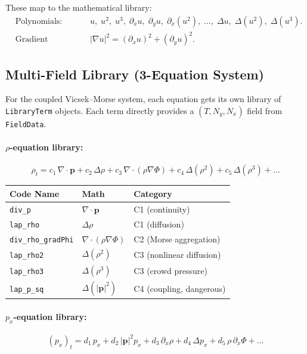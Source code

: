\documentclass[11pt]{article}
\newcommand{\bp}{\mathbf{p}}
\begin{document}
These map to the mathematical library:
\begin{align}
  &\text{Polynomials:} &&
  u,\; u^2,\; u^3,\;
  \partial_x u,\; \partial_y u,\;
  \partial_x(u^2),\; \ldots,\;
  \Delta u,\; \Delta(u^2),\; \Delta(u^3). \\
  &\text{Gradient nonlinearity:} &&
  |\nabla u|^2 = (\partial_x u)^2 + (\partial_y u)^2.
\end{align}


\subsection{Multi-Field Library (3-Equation System)}
\label{sec:multifield_library}

For the coupled Vicsek--Morse system, each equation gets its own
library of \texttt{LibraryTerm} objects.  Each term directly provides
a $(T, N_y, N_x)$ field from \texttt{FieldData}.

\paragraph{$\rho$-equation library:}
\begin{equation}
  \rho_t = c_1\,\nabla\cdot\bp
  + c_2\,\Delta\rho
  + c_3\,\nabla\cdot(\rho\nabla\Phi)
  + c_4\,\Delta(\rho^2)
  + c_5\,\Delta(\rho^3)
  + \ldots
\end{equation}

\begin{center}
\begin{tabular}{lll}
\toprule
\textbf{Code Name} & \textbf{Math} & \textbf{Category} \\
\midrule
\texttt{div\_p} & $\nabla\cdot\bp$ & C1 (continuity) \\
\texttt{lap\_rho} & $\Delta\rho$ & C1 (diffusion) \\
\texttt{div\_rho\_gradPhi} & $\nabla\cdot(\rho\nabla\Phi)$ & C2 (Morse aggregation) \\
\texttt{lap\_rho2} & $\Delta(\rho^2)$ & C3 (nonlinear diffusion) \\
\texttt{lap\_rho3} & $\Delta(\rho^3)$ & C3 (crowd pressure) \\
\texttt{lap\_p\_sq} & $\Delta(|\bp|^2)$ & C4 (coupling, dangerous) \\
\bottomrule
\end{tabular}
\end{center}

\paragraph{$p_x$-equation library:}
\begin{equation}
  (p_x)_t = d_1\, p_x
  + d_2\,|\bp|^2 p_x
  + d_3\,\partial_x\rho
  + d_4\,\Delta p_x
  + d_5\,\rho\,\partial_x\Phi
  + \ldots
\end{equation}
\end{document}
